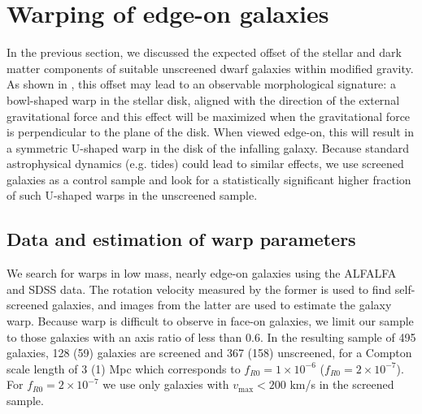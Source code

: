 \documentclass[twocolappendix, numberedappendix]{emulateapj}
\newcommand{\jakesays}[1]{{\color{red}[Jake says: #1]}}
\newcommand{\vinusays}[1]{{\color{blue}[Vinu says: #1]}}
\begin{document}
\section{Warping of edge-on galaxies}
\label{sec:warp}

In the previous section, we discussed the expected offset of the stellar
and dark matter components of suitable unscreened dwarf galaxies within
modified gravity.  As shown in \citet{bhuvjake2011}, this offset may lead
to an observable morphological signature: a bowl-shaped warp in the stellar
disk, aligned with the direction of the external gravitational force and this
effect will be maximized when the gravitational
force is perpendicular to the plane of the disk. When viewed edge-on,
this will result in a symmetric U-shaped warp in the disk of the infalling
galaxy.  Because standard astrophysical dynamics (e.g. tides) could lead to
similar effects, we use screened galaxies as a control sample and look for
a statistically significant higher fraction of such U-shaped warps in the
unscreened sample.

\subsection{Data and estimation of warp parameters}
We search for warps in low mass, nearly edge-on galaxies using the
ALFALFA and SDSS data. The rotation velocity measured by the former is used to
find self-screened galaxies, and images from the latter are
used to estimate the galaxy warp.
Because warp is difficult to observe in face-on
galaxies, we limit our sample to those galaxies with an axis ratio
of less than 0.6. In the resulting sample of 495 galaxies, 128 (59) 
galaxies are screened and 367 (158) unscreened, for a Compton scale length of 3
(1) Mpc which corresponds to $f_{R0}=1 \times 10^{-6}$ ($f_{R0}=2 \times
10^{-7}$). For $f_{R0}=2 \times 10^{-7}$ we use only galaxies with
$v_\mathrm{max} < 200$ km/s in the screened sample.
\end{document}
